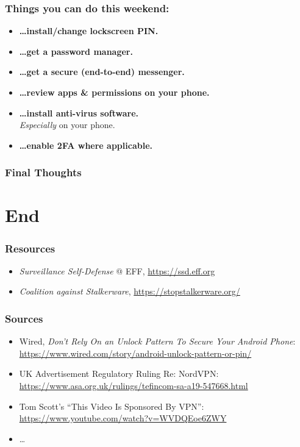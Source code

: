 \documentclass[aspectratio=169,dvipsnames]{beamer}
\newcommand{\backupbegin}{
   \newcounter{finalframe}
   \setcounter{finalframe}{\value{framenumber}}
}
\newcommand{\backupend}{
   \setcounter{framenumber}{\value{finalframe}}
}
\begin{document}
\begin{frame}
\frametitle{Things you can do this weekend:}
\begin{itemize}
\pause\item\textbf{\dots install/change lockscreen PIN.}
\pause\item\textbf{\dots get a password manager.}
\pause\item\textbf{\dots get a secure (end-to-end) messenger.}
\pause\item\textbf{\dots review apps \& permissions on your phone.}
\pause\item\textbf{\dots install anti-virus software.}\\
\emph{Especially} on your phone. 
\pause\item\textbf{\dots enable 2FA where applicable.}
\end{itemize}
\end{frame}

\begin{frame}
\frametitle{Final Thoughts}
\end{frame}

\appendix
\backupbegin

\section{End}

\begin{frame}
\frametitle{Resources}

\begin{itemize}
\item \emph{Surveillance Self-Defense} @ EFF, \url{https://ssd.eff.org}
\item \emph{Coalition against Stalkerware}, \url{https://stopstalkerware.org/}
\end{itemize}

\end{frame}

\begin{frame}
\frametitle{Sources}
\footnotesize

\begin{itemize}
\item Wired, \emph{Don't Rely On an Unlock Pattern To Secure Your Android Phone}: \\
\url{https://www.wired.com/story/android-unlock-pattern-or-pin/}
\item UK Advertisement Regulatory Ruling Re: NordVPN:\\
\url{https://www.asa.org.uk/rulings/tefincom-sa-a19-547668.html}
\item Tom Scott's ``This Video Is Sponsored By VPN'':\\
\url{https://www.youtube.com/watch?v=WVDQEoe6ZWY}
\item\dots
\end{itemize}

\end{frame}

\backupend
\end{document}

